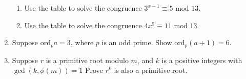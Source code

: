 \documentclass[class=article, crop=false]{standalone}
\def\ord{{\text{ord}}}
\begin{document}
\begin{enumerate}
\begin{enumerate}
		\item Use the table to solve the congruence $3^{x-1} \equiv 5\mbox{ mod } 13$.
		
		\item Use the table to solve the congruence $4x^5 \equiv 11 \mbox{ mod } 13$.
	
	\end{enumerate}

	\item Suppose $\ord_p a = 3$, where $p$ is an odd prime. Show $\ord_p (a+1) = 6$.
	
	\item Suppose $r$ is a primitive root modulo $m$, and $k$ is a positive integers with
	$\gcd(k, \phi(m))=1$ Prove $r^k$ is also a primitive root.
\end{enumerate}

\end{document}
